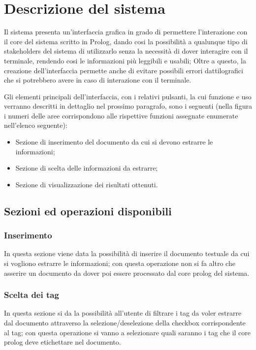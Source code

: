 \section{Descrizione del sistema}

Il sistema presenta un'interfaccia grafica in grado di permettere l'interazione con il core del sistema scritto in Prolog, dando cosi la possibilità a qualunque tipo di stakeholders del sistema di utilizzarlo senza la necessità di dover interagire con il terminale, rendendo cosi le informazioni più leggibili e usabili; Oltre a questo, la creazione dell'interfaccia permette anche di evitare possibili errori dattilografici che si potrebbero avere in caso di interazione con il terminale.

Gli elementi principali dell'interfaccia, con i relativi pulsanti, la cui funzione e uso verranno descritti in dettaglio nel prossimo paragrafo, sono i seguenti (nella figura %
i numeri delle aree corrispondono alle rispettive funzioni assegnate enumerate
nell'elenco seguente):
\begin{itemize}
  \item Sezione di inserimento del documento da cui si devono estrarre le informazioni;
  \item Sezione di scelta delle informazioni da estrarre;
  \item Sezione di visualizzazione dei risultati ottenuti.
\end{itemize}
\subsection{Sezioni ed operazioni disponibili}
    \subsubsection{Inserimento}
    \label{Inserimento}
    In questa sezione viene data la possibilità di inserire il documento testuale da cui si vogliono estrarre le informazioni; con questa operazione non si fa altro che asserire un documento da dover poi essere processato dal core prolog del sistema.
    \subsubsection{Scelta dei tag}
    \label{ChoiceTag}
    In questa sezione si da la possibilità all'utente di filtrare i tag da voler estrarre dal documento attraverso la selezione/deselezione della checkbox corrispondente al tag; con questa operazione si vanno a selezionare quali saranno i tag che il core prolog deve etichettare nel documento.
